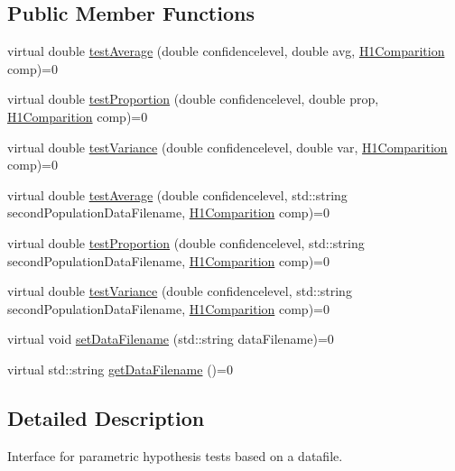 \subsection*{Public Member Functions}
\begin{DoxyCompactItemize}
\item 
virtual double \hyperlink{class_hypothesis_tester__if_a29d22c28706df9f15f4e9ee9d1b0c731}{test\+Average} (double confidencelevel, double avg, \hyperlink{class_hypothesis_tester__if_a89153ff990252f9f79856a2f2532c349}{H1\+Comparition} comp)=0
\item 
virtual double \hyperlink{class_hypothesis_tester__if_a88976ae23f3c51f5c7c01925aa99eba9}{test\+Proportion} (double confidencelevel, double prop, \hyperlink{class_hypothesis_tester__if_a89153ff990252f9f79856a2f2532c349}{H1\+Comparition} comp)=0
\item 
virtual double \hyperlink{class_hypothesis_tester__if_a2470af2866aef963aa60bd15f4a4dbf1}{test\+Variance} (double confidencelevel, double var, \hyperlink{class_hypothesis_tester__if_a89153ff990252f9f79856a2f2532c349}{H1\+Comparition} comp)=0
\item 
virtual double \hyperlink{class_hypothesis_tester__if_ab1fbc924ef6c33f3b4ef695f3a77160c}{test\+Average} (double confidencelevel, std\+::string second\+Population\+Data\+Filename, \hyperlink{class_hypothesis_tester__if_a89153ff990252f9f79856a2f2532c349}{H1\+Comparition} comp)=0
\item 
virtual double \hyperlink{class_hypothesis_tester__if_a8eeb7b4fd202fe9ffe46841bdeed0b79}{test\+Proportion} (double confidencelevel, std\+::string second\+Population\+Data\+Filename, \hyperlink{class_hypothesis_tester__if_a89153ff990252f9f79856a2f2532c349}{H1\+Comparition} comp)=0
\item 
virtual double \hyperlink{class_hypothesis_tester__if_a28e2e287d35f6843a14bd2765b76b6bb}{test\+Variance} (double confidencelevel, std\+::string second\+Population\+Data\+Filename, \hyperlink{class_hypothesis_tester__if_a89153ff990252f9f79856a2f2532c349}{H1\+Comparition} comp)=0
\item 
virtual void \hyperlink{class_hypothesis_tester__if_ae7cfc801a3c0206844e3bc73e0b4234a}{set\+Data\+Filename} (std\+::string data\+Filename)=0
\item 
virtual std\+::string \hyperlink{class_hypothesis_tester__if_a37b02ea209d8f6b566af9e2fff6511cc}{get\+Data\+Filename} ()=0
\end{DoxyCompactItemize}


\subsection{Detailed Description}
Interface for parametric hypothesis tests based on a datafile. 


